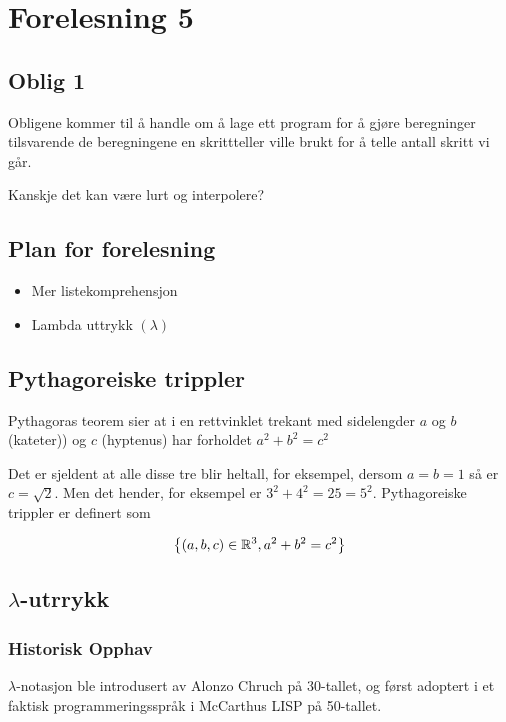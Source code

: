 \documentclass{article}
\begin{document}
    \section{Forelesning 5}

    \subsection{Oblig 1}
    Obligene kommer til å handle om å lage ett program for å gjøre beregninger tilsvarende de beregningene en skrittteller ville brukt for å telle antall skritt vi går.

    Kanskje det kan være lurt og interpolere?


    \subsection{Plan for forelesning}
    \begin{itemize}
        \item Mer listekomprehensjon
        \item Lambda uttrykk \( \left( \lambda \right) \)
    \end{itemize}

    \subsection{Pythagoreiske trippler}
    Pythagoras teorem sier at i  en rettvinklet trekant med sidelengder \( a \) og \( b \) (kateter)) og \( c \) (hyptenus) har forholdet \( a^2 + b^2 = c^2 \)


    Det er sjeldent at alle disse tre blir heltall, for eksempel, dersom \( a = b = 1 \) så er \( c = \sqrt{2} \). Men det hender, for eksempel er \( 3^2 + 4^2 = 25 = 5^2 \). Pythagoreiske trippler er definert som

    \[ \left\{ \left( a,b,c \right) \in \mathbb{R}^3, a^2 + b ^2 = c^2 \right\} \]

    \subsection{\( \lambda \)-utrrykk}

    \subsubsection{Historisk Opphav}
    \( \lambda \)-notasjon ble introdusert av Alonzo Chruch på 30-tallet, og først adoptert i et faktisk programmeringsspråk i McCarthus LISP på 50-tallet.
    \bigskip
\end{document}
